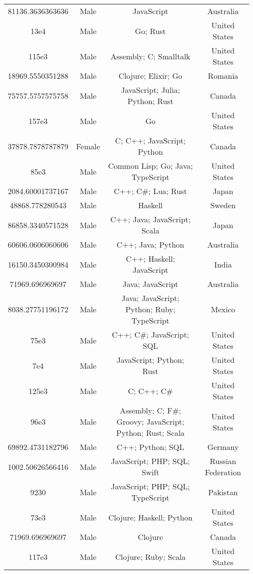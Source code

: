 \begin{center}
\begin{tabular}{ |c|c|c|c| }
81136.3636363636  &  Male  &  JavaScript  &  Australia  \\ 
13e4  &  Male  &  Go; Rust  &  United States  \\ 
115e3  &  Male  &  Assembly; C; Smalltalk  &  United States  \\ 
18969.5550351288  &  Male  &  Clojure; Elixir; Go  &  Romania  \\ 
75757.5757575758  &  Male  &  JavaScript; Julia; Python; Rust  &  Canada  \\ 
157e3  &  Male  &  Go  &  United States  \\ 
37878.7878787879  &  Female  &  C; C++; JavaScript; Python  &  Canada  \\ 
85e3  &  Male  &  Common Lisp; Go; Java; TypeScript  &  United States  \\ 
2084.60001737167  &  Male  &  C++; C\#; Lua; Rust  &  Japan  \\ 
48868.778280543  &  Male  &  Haskell  &  Sweden  \\ 
86858.3340571528  &  Male  &  C++; Java; JavaScript; Scala  &  Japan  \\ 
60606.0606060606  &  Male  &  C++; Java; Python  &  Australia  \\ 
16150.3450300984  &  Male  &  C++; Haskell; JavaScript  &  India  \\ 
71969.696969697  &  Male  &  Java; JavaScript  &  Australia  \\ 
8038.27751196172  &  Male  &  Java; JavaScript; Python; Ruby; TypeScript  &  Mexico  \\ 
75e3  &  Male  &  C++; C\#; JavaScript; SQL  &  United States  \\ 
7e4  &  Male  &  JavaScript; Python; Rust  &  United States  \\ 
125e3  &  Male  &  C; C++; C\#  &  United States  \\ 
96e3  &  Male  &  Assembly; C; F\#; Groovy; JavaScript; Python; Rust; Scala  &  United States  \\ 
69892.4731182796  &  Male  &  C++; Python; SQL  &  Germany  \\ 
1002.50626566416  &  Male  &  JavaScript; PHP; SQL; Swift  &  Russian Federation  \\ 
9230  &  Male  &  JavaScript; PHP; SQL; TypeScript  &  Pakistan  \\ 
73e3  &  Male  &  Clojure; Haskell; Python  &  United States  \\ 
71969.696969697  &  Male  &  Clojure  &  Canada  \\ 
117e3  &  Male  &  Clojure; Ruby; Scala  &  United States  \\ 

\end{tabular}
\end{center}

